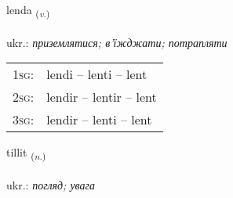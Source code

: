 \documentclass[frontgrid, backgrid]{flacards}\usepackage[]{graphicx}\usepackage[]{xcolor}
\begin{document}
\renewcommand{\flhead}{\vskip5pt \fboxsep=0pt {\small\bfseries\footnotesize Sagnorð | дієслово}}
\renewcommand{\fcfoot}{\vskip5pt \fboxsep=0pt \hspace{2pt}{\small\bfseries\footnotesize 1K}}

\renewcommand{\blhead}{\vskip5pt {\small\bfseries\footnotesize Sagnorð | дієслово }}
\renewcommand{\bcfoot}{\vskip5pt \hspace{2pt}{\small\bfseries\footnotesize 1K}}


{lenda \small{\textsubscript{(\textit{v.})}} \\[1ex] %
\textphonetic{[lɛnta]} \\
ukr.: \emph{приземлятися; в'їжджати; потрапляти} \\  [2ex]
\renewcommand*{\arraystretch}{0.8}
\begin{tabular}{p{1cm}l}
\textsc{1sg}: & lendi -- lenti -- lent \\ 
\textsc{2sg}: & lendir -- lentir -- lent \\ 
\textsc{3sg}: & lendir -- lenti -- lent \\ 
\end{tabular}
}

\renewcommand{\flhead}{\vskip5pt \fboxsep=0pt {\small\bfseries\footnotesize Nafnorð | іменник}}
\renewcommand{\fcfoot}{\vskip5pt \fboxsep=0pt \hspace{2pt}{\small\bfseries\footnotesize 1K}}

\renewcommand{\blhead}{\vskip5pt {\small\bfseries\footnotesize Nafnorð | іменник }}
\renewcommand{\bcfoot}{\vskip5pt \hspace{2pt}{\small\bfseries\footnotesize 1K}}


{tillit \small{\textsubscript{(\textit{n.})}} \\[1ex] %
\textphonetic{[tʰɪlɪt]} \\
ukr.: \emph{погляд; увага} \\  [2ex]
\renewcommand*{\arraystretch}{0.8}
}
\end{document}
